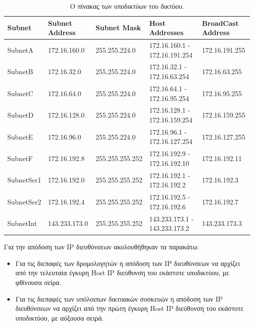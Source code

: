 \documentclass{assignment}
\begin{document}
\begin{table}
\begin{center}
  \begin{tabular}{|m{2.3cm}|m{2.9cm}|m{3.5cm}|m{3.4cm}|m{3.3cm}|}
    \hline
    Subnet & Subnet Address & Subnet Mask & Host Addresses & BroadCast Address \\ \hline
  SubnetA & 172.16.160.0 & 255.255.224.0 & 172.16.160.1 - 172.16.191.254 & 172.16.191.255 \\ \hline
  SubnetB & 172.16.32.0 & 255.255.224.0 & 172.16.32.1 - 172.16.63.254 & 172.16.63.255 \\ \hline
  SubnetC & 172.16.64.0 & 255.255.224.0 & 172.16.64.1 - 172.16.95.254 & 172.16.95.255 \\ \hline
  SubnetD & 172.16.128.0 & 255.255.224.0 & 172.16.128.1 - 172.16.159.254 & 172.16.159.255 \\ \hline
  SubnetE & 172.16.96.0 & 255.255.224.0 & 172.16.96.1 - 172.16.127.254 & 172.16.127.255 \\ \hline
  SubnetF & 172.16.192.8 & 255.255.255.252 & 172.16.192.9 - 172.16.192.10 & 172.16.192.11 \\ \hline
  SubnetSer1 & 172.16.192.0 & 255.255.255.252 & 172.16.192.1 - 172.16.192.2 & 172.16.192.3 \\ \hline
  SubnetSer2 & 172.16.192.4 & 255.255.255.252 & 172.16.192.5 - 172.16.192.6 & 172.16.192.7 \\ \hline
  SubnetInt & 143.233.173.0 & 255.255.255.252 & 143.233.173.1 - 143.233.173.2 & 143.233.173.3 \\ \hline


  
  \end{tabular}
\caption{Ο πίνακας των υποδικτύων του δικτύου.}
\label{table:VLSM_subnetting}
\end{center}
\end{table}

Για την απόδοση των ΙΡ διευθύνσεων ακολουθήθηκαν τα παρακάτω:
\begin{itemize}
\item Για τις διεπαφές των δρομολογητών η απόδοση των ΙΡ διευθύνσεων να αρχίζει από την τελευταία έγκυρη Host IP διεύθυνση του εκάστοτε υποδικτύου, με φθίνουσα σείρα.
\item Για τις διεπαφές των υπόλοιπων δικτυακών συσκευών η απόδοση των ΙΡ
διευθύνσεων να αρχίζει από την πρώτη έγκυρη Host IP διεύθυνση του εκάστοτε
υποδικτύου, με αύξουσα σειρά.
\end{itemize}
\end{document}
